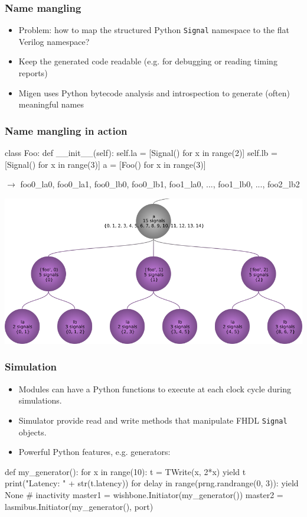 \documentclass{beamer}
\newcommand\bgoff{\setbeamertemplate{background}{}}
\begin{document}
\begin{frame}[fragile]
\frametitle{Name mangling}
\begin{itemize}
\item Problem: how to map the structured Python \verb!Signal! namespace to the flat Verilog namespace?
\item Keep the generated code readable (e.g. for debugging or reading timing reports)
\item Migen uses Python bytecode analysis and introspection to generate (often) meaningful names
\end{itemize}
\end{frame}

\begin{frame}[fragile]
\frametitle{Name mangling in action}
\begin{verbatimtab}
class Foo:
    def __init__(self):
        self.la = [Signal() for x in range(2)]
        self.lb = [Signal() for x in range(3)]
a = [Foo() for x in range(3)]
\end{verbatimtab}

$\rightarrow$ foo0\_la0, foo0\_la1, foo0\_lb0, foo0\_lb1, foo1\_la0, ...,
  foo1\_lb0, ..., foo2\_lb2
\end{frame}

\begin{frame}
\centering \includegraphics[width=\textwidth]{name_mangling.png}
\end{frame}

\bgoff
\begin{frame}[fragile]
\frametitle{Simulation}
\begin{itemize}
\item Modules can have a Python functions to execute at each clock cycle during simulations.
\item Simulator provide read and write methods that manipulate FHDL \verb!Signal! objects.
\item Powerful Python features, e.g. generators:
\end{itemize}
\begin{verbatimtab}
def my_generator():
        for x in range(10):
                t = TWrite(x, 2*x)
                yield t
                print("Latency: " + str(t.latency))
                for delay in range(prng.randrange(0, 3)):
                        yield None # inactivity
master1 = wishbone.Initiator(my_generator())
master2 = lasmibus.Initiator(my_generator(), port)
\end{verbatimtab}
\end{frame}
\end{document}
